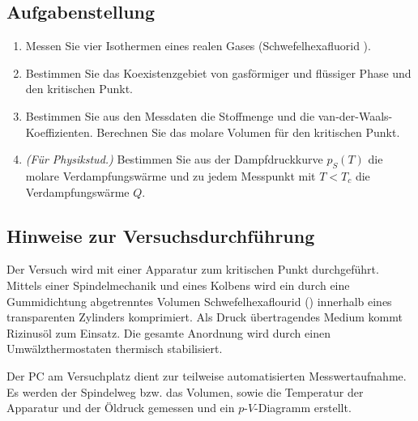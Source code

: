 \documentclass[platz]{tudphygp}
\begin{document}
\maketitle

\subsection*{Aufgabenstellung}

\begin{enumerate}
 \item Messen Sie vier Isothermen eines realen Gases 
       (Schwefelhexafluorid ).
 \item Bestimmen Sie das Koexistenzgebiet von gasf\"ormiger und fl\"ussiger Phase und den kritischen Punkt.
 \item Bestimmen Sie aus den Messdaten die Stoffmenge und die
       van-der-Waals-Koeffizienten. Berechnen Sie das molare Volumen f\"ur den kritischen Punkt.
 \item \emph{(F\"ur Physikstud.)} Bestimmen Sie aus der Dampfdruckkurve $p_S(T)$
                                die molare Verdampfungsw\"arme und zu jedem
                                Messpunkt mit $T < T_c$ die Verdampfungsw\"arme $Q$.
\end{enumerate}

\subsection*{Hinweise zur Versuchsdurchf\"uhrung}

Der Versuch wird mit einer Apparatur zum kritischen Punkt
durchgef\"uhrt. Mittels einer Spindelmechanik und eines Kolbens wird ein durch
eine Gummidichtung abgetrenntes Volumen Schwefelhexaflourid () innerhalb
eines transparenten Zylinders komprimiert. Als Druck \"ubertragendes Medium
kommt Rizinus\"ol zum Einsatz. Die gesamte Anordnung wird durch einen
Umw\"alzthermostaten thermisch stabilisiert. 

Der PC am Versuchplatz dient zur teilweise automatisierten
Messwertaufnahme. Es werden der Spindelweg bzw. das Volumen, sowie die
Temperatur der Apparatur und der \"Oldruck gemessen und ein $p$-$V$-Diagramm
erstellt. 

\end{document}

